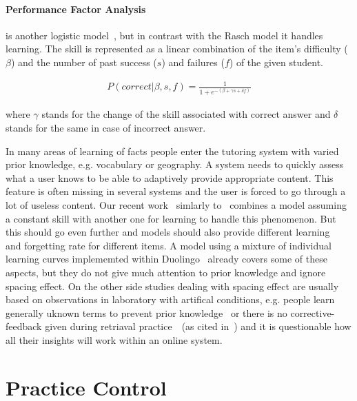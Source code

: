 \documentclass[table,color]{fithesis3/fithesis3}
\begin{document}
\paragraph*{Performance Factor Analysis} is another logistic
model~\cite{pavlik2009performance}, but in contrast with the Rasch model it
handles learning. The skill is represented as a linear combination of the
item's difficulty ($\beta$) and the number of past success ($s$) and failures
($f$) of the given student.

\begin{align}
P(correct|\beta,s, f) = \frac{1}{1 + e^{-(\beta + \gamma s + \delta f)}}
\end{align}

where $\gamma$ stands for the change of the skill associated with correct
answer and $\delta$ stands for the same in case of incorrect answer.

\bigskip

\noindent
In many areas of learning of facts people enter the tutoring system with varied
prior knowledge, e.g. vocabulary or geography. A system needs to quickly assess
what a user knows to be able to adaptively provide appropriate content. This
feature is often missing in several systems and the user is forced to go through
a lot of useless content. Our recent work~\cite{papousek2014adaptive} simlarly
to~\cite{khajah2014integrating} combines a model assuming a constant skill with
another one for learning to handle this phenomenon.  But this should go even
further and models should also provide different
learning~\cite{pelanek2015modeling} and forgetting rate for different items.
A model using a mixture of individual learning curves implememted within
Duolingo~\cite{streeter2015mixture} already covers some of these aspects, but
they do not give much attention to prior knowledge and ignore spacing effect.
On the other side studies dealing with spacing effect are usually based on
observations in laboratory with artifical conditions, e.g.  people learn
generally uknown terms to prevent prior knowledge~\cite{kang2014retrieval} or
there is no corrective-feedback given during retriaval
practice~\cite{landauer1978optimum}~(as cited in~\cite{kang2014retrieval}) and
it is questionable how all their insights will work within an online system.

\section{Practice Control}
\label{section:practice_control}
\end{document}

